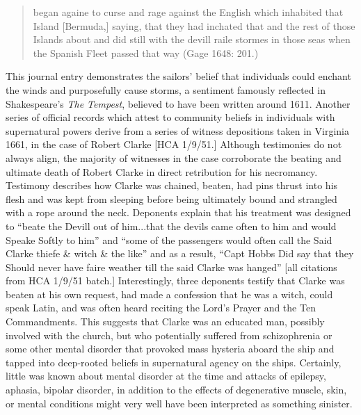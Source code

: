 \begin{quotation}
began againe to curse and rage against the English which inhabited that Island [Bermuda,] saying, that they had inchated that and the rest of those Islands about and did still with the devill raile stormes in those seas when the Spanish Fleet passed that way (Gage 1648: 201.) 

\end{quotation}
\begin{styleStandard}
This journal entry demonstrates the sailors’ belief that individuals could enchant the winds and purposefully cause storms, a sentiment famously reflected in Shakespeare’s \textit{The Tempest}, believed to have been written around 1611. Another series of official records which attest to community beliefs in individuals with supernatural powers derive from a series of witness depositions taken in Virginia 1661, in the case of Robert Clarke [HCA 1/9/51.] Although testimonies do not always align, the majority of witnesses in the case corroborate the beating and ultimate death of Robert Clarke in direct retribution for his necromancy. Testimony describes how Clarke was chained, beaten, had pins thrust into his flesh and was kept from sleeping before being ultimately bound and strangled with a rope around the neck. Deponents explain that his treatment was designed to “beate the Devill out of him...that the devils came often to him and would Speake Softly to him” and “some of the passengers would often call the Said Clarke thiefe \& witch \& the like” and as a result, “Capt Hobbs Did say that they Should never have faire weather till the said Clarke was hanged” [all citations from HCA 1/9/51 batch.] Interestingly, three deponents testify that Clarke was beaten at his own request, had made a confession that he was a witch, could speak Latin, and was often heard reciting the Lord’s Prayer and the Ten Commandments. This suggests that Clarke was an educated man, possibly involved with the church, but who potentially suffered from schizophrenia or some other mental disorder that provoked mass hysteria aboard the ship and tapped into deep-rooted beliefs in supernatural agency on the ships. Certainly, little was known about mental disorder at the time and attacks of epilepsy, aphasia, bipolar disorder, in addition to the effects of degenerative muscle, skin, or mental conditions might very well have been interpreted as something sinister. 
\end{styleStandard}



